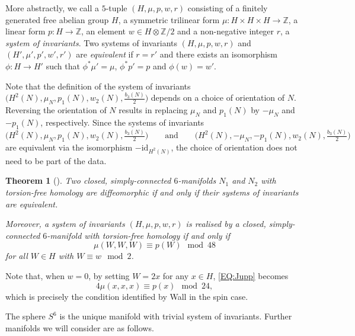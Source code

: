\documentclass[10pt,a4paper]{amsart}
\numberwithin{equation}{section}
\newtheorem{Theorem}{Theorem}[section]
\theoremstyle{definition}
\numberwithin{table}{section}
\newcommand{\Z}{\mathbb{Z}}
\begin{document}
More abstractly, we call a $5$-tuple $(H,\mu,p,w,r)$ consisting of a finitely generated free abelian group $H$, a symmetric trilinear form $\mu\colon H\times H \times H\to \Z$, a linear form $p\colon H\to \Z$, an element $w\in H\otimes\Z/2$ and a non-negative integer $r$, a \emph{system of invariants}. Two systems of invariants $(H,\mu,p,w,r)$ and $(H',\mu',p',w',r')$ are \emph{equivalent} if $r=r'$ and there exists an isomorphism $\phi\colon H\to H'$ such that $\phi^*\mu'=\mu$, $\phi^* p'=p$ and $\phi(w)=w'$.

Note that the definition of the system of invariants $\bigl(H^2(N),\mu_N,p_1(N),w_2(N),\frac{b_3(N)}{2}\bigr)$ depends on a choice of orientation of $N$. Reversing the orientation of $N$ results in replacing $\mu_N$ and $p_1(N)$ by $-\mu_N$ and $-p_1(N)$, respectively. Since the systems of invariants
\[\Big(H^2(N),\mu_N,p_1(N),w_2(N),\tfrac{b_3(N)}{2}\Big)\qquad \text{and}\qquad \Big(H^2(N),-\mu_N,-p_1(N),w_2(N),\tfrac{b_3(N)}{2}\Big)\]
are equivalent via the isomorphism $-\mathrm{id}_{H^2(N)}$, the choice of orientation does not need to be part of the data.

\begin{Theorem}[{\cite{Ju73}}]\label{T:Jupp}
	Two closed, simply-connected $6$-manifolds $N_1$ and $N_2$ with torsion-free homology are diffeomorphic if and only if their systems of invariants are equivalent.
	
	Moreover, a system of invariants $(H,\mu,p,w,r)$ is realised by a closed, simply-connected $6$-manifold with torsion-free homology if and only if
	\begin{equation}\label{EQ:Jupp}
		\mu(W,W,W)\equiv p(W)\mod 48
	\end{equation}
	for all $W\in H$ with $W\equiv w\mod 2$.
\end{Theorem}
Note that, when $w=0$, by setting $W=2x$ for any $x\in H$, \eqref{EQ:Jupp} becomes
\begin{equation}\label{EQ:Wall}
	4\mu(x,x,x)\equiv p(x)\mod 24,
\end{equation}
which is precisely the condition identified by Wall \cite[Theorem 5]{Wa66} in the spin case.

The sphere $S^6$ is the unique manifold with trivial system of invariants. Further manifolds we will consider are as follows.
\end{document}
